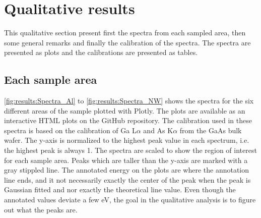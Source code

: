 \section{Qualitative results}
\label{sec:results:qualitative}

This qualitative section present first the spectra from each sampled area, then some general remarks and finally the calibration of the spectra. The spectra are presented as plots and the calibrations are presented as tables.


\subsection{Each sample area}
\label{sec:results:qualitative:each_sample_area}

\cref{fig:results:Spectra_Al} to \cref{fig:results:Spectra_NW} shows the spectra for the six different areas of the sample plotted with Plotly.
The plots are available as an interactive HTML plots on the GitHub repository.
The calibration used in these spectra is based on the calibration of Ga L$\alpha$ and As K$\alpha$ from the GaAs bulk wafer.
The y-axis is normalized to the highest peak value in each spectrum, i.e. the highest peak is always 1. %
The spectra are scaled to show the region of interest for each sample area.
Peaks which are taller than the y-axis are marked with a gray stippled line.
The annotated energy on the plots are where the annotation line ends, and it not necessarily exactly the center of the peak when the peak is Gaussian fitted and nor exactly the theoretical line value.
Even though the annotated values deviate a few eV, the goal in the qualitative analysis is to figure out what the peaks are.



